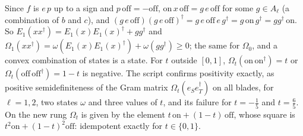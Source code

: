 Since $f$ is $e\,p$ up to a sign and $p\,\mathrm{off} = -\mathrm{off}$, $\mathrm{on}\,x\,\mathrm{off} = g\,e\,\mathrm{off}$ for some $g \in A_{\ell}$ (a combination of $b$ and $c$), and $(g\,e\,\mathrm{off})(g\,e\,\mathrm{off})^{\dagger} = g\,e\,\mathrm{off}\,e\,g^{\dagger} = g\,\mathrm{on}\,g^{\dagger} = gg^{\dagger}\,\mathrm{on}$. So $E_{1}(xx^{\dagger}) = E_{1}(x)E_{1}(x)^{\dagger} + gg^{\dagger}$ and $\Omega_{1}(xx^{\dagger}) = \omega(E_{1}(x)E_{1}(x)^{\dagger}) + \omega(gg^{\dagger}) \ge 0$; the same for $\Omega_{0}$, and a convex combination of states is a state. For $t$ outside $[0, 1]$, $\Omega_{t}(\mathrm{on}\,\mathrm{on}^{\dagger}) = t$ or $\Omega_{t}(\mathrm{off}\,\mathrm{off}^{\dagger}) = 1 - t$ is negative. The script confirms positivity exactly, as positive semidefiniteness of the Gram matrix $\Omega_{t}(e_{S}e_{T}^{\dagger})$ on all blades, for $\ell = 1, 2$, two states $\omega$ and three values of $t$, and its failure for $t = -\tfrac15$ and $t = \tfrac65$. On the new rung $\Omega_{t}$ is given by the element $t\,\mathrm{on} + (1 - t)\,\mathrm{off}$, whose square is $t^{2}\mathrm{on} + (1 - t)^{2}\mathrm{off}$: idempotent exactly for $t \in \{0, 1\}$.


